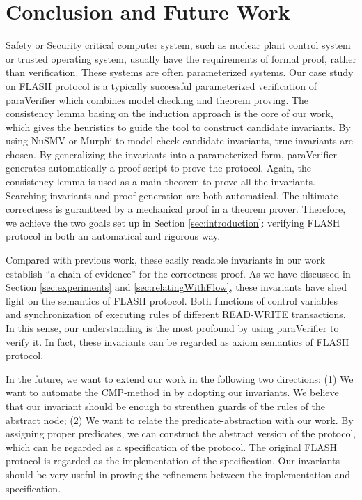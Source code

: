 \documentclass{llncs}
\newcommand{\bedt}[1]{{\color{blue}#1}}
\begin{document}
\section{Conclusion and Future Work\label{sec:conclusion}}
\bedt{Safety or Security critical computer system, such as nuclear plant control system or trusted operating system, usually have the requirements of formal proof, rather than verification. These systems are often parameterized systems.} Our case study on FLASH protocol is a  typically successful \bedt{parameterized verification} of {\sf paraVerifier} which combines model checking and theorem proving. The consistency lemma basing on the induction approach is the
core of our work, which gives the heuristics to guide the tool
 to construct candidate invariants. By using NuSMV or Murphi to model check  candidate invariants, true invariants are  chosen.  By generalizing the invariants into a parameterized form, {\sf paraVerifier} generates automatically a proof script to  prove the protocol. Again, the consistency lemma is used as a main theorem to prove all the invariants. Searching invariants and proof generation are both automatical. The ultimate correctness is gurantteed by a mechanical proof in a theorem prover. Therefore, we \bedt{achieve} the two goals set up in Section \ref{sec:introduction}: verifying FLASH protocol in both an automatical and rigorous way.

 Compared with previous work, \bedt{these easily readable invariants in our work establish ``a chain of evidence'' for the correctness proof.} As we have discussed in Section \ref{sec:experiments} and \ref{sec:relatingWithFlow}, these invariants have shed light on the semantics of FLASH protocol. Both functions of control variables and synchronization of executing rules of different  READ-WRITE transactions. In this sense,  our understanding  is the most profound by using {\sf paraVerifier} to verify it. In fact, these invariants can be regarded as axiom semantics of FLASH protocol. %

 In the future, we want to extend our work in the following two directions: (1) We want to automate the CMP-method in \cite{Chou2004} by adopting our invariants. We believe that our invariant should be enough to strenthen   guards of the rules of the abstract node; (2) We want to relate the predicate-abstraction with our work. By assigning proper predicates, we can construct the abstract version of the protocol, which can be regarded as a specification of the protocol. The original FLASH protocol is regarded as the implementation of the specification. Our invariants should be very useful in proving the refinement between the implementation and specification.
\end{document}

